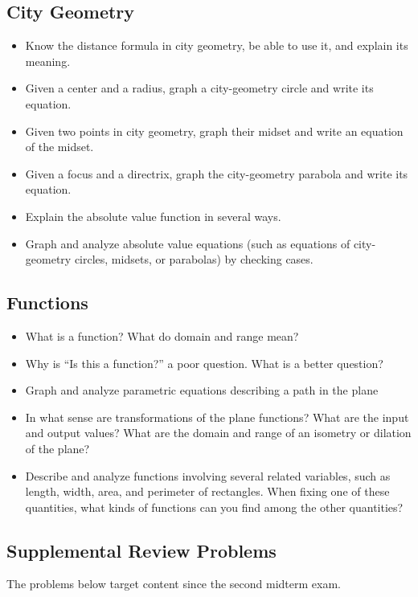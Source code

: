 \subsection*{City Geometry}
\begin{itemize}\itemsep-3pt
\item Know the distance formula in city geometry, be able to use it, and explain its meaning. 
\item Given a center and a radius, graph a city-geometry circle and write its equation.  
\item Given two points in city geometry,  graph their midset and write an equation of the midset.  
\item Given a focus and a directrix, graph the city-geometry parabola and write its equation.  
\item Explain the absolute value function in several ways.
\item Graph and analyze absolute value equations (such as equations of city-geometry circles, midsets, or parabolas) by checking cases.  
\end{itemize}

\subsection*{Functions}
\begin{itemize}\itemsep-3pt
\item What is a function?  What do domain and range mean?  
\item Why is ``Is this a function?'' a poor question.  What is a better question?  
\item Graph and analyze parametric equations describing a path in the plane
\item In what sense are transformations of the plane functions?  What are the input and output values?  What are the domain and range of an isometry or dilation of the plane?  
\item Describe and analyze functions involving several related variables, such as length, width, area, and perimeter of rectangles.   When fixing one of these quantities, what kinds of functions can you find among the other quantities? 
\end{itemize}



\subsection{Supplemental Review Problems}
The problems below target content since the second midterm exam. 


